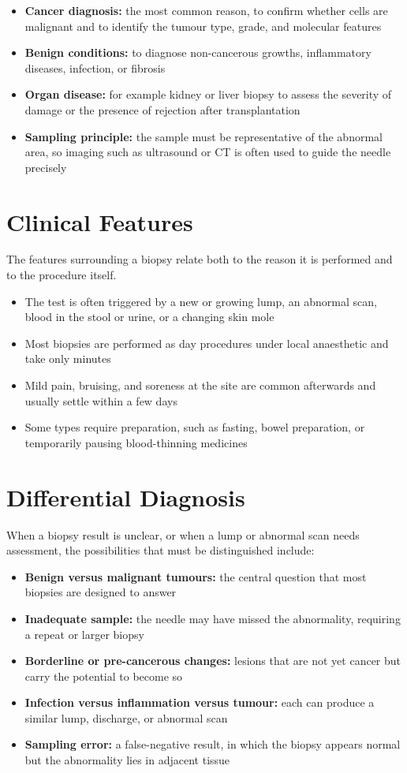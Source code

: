 \begin{itemize}
    \item \textbf{Cancer diagnosis:} the most common reason, to confirm whether cells are malignant and to identify the tumour type, grade, and molecular features
    \item \textbf{Benign conditions:} to diagnose non-cancerous growths, inflammatory diseases, infection, or fibrosis
    \item \textbf{Organ disease:} for example kidney or liver biopsy to assess the severity of damage or the presence of rejection after transplantation
    \item \textbf{Sampling principle:} the sample must be representative of the abnormal area, so imaging such as ultrasound or CT is often used to guide the needle precisely
\end{itemize}

\section*{Clinical Features}
The features surrounding a biopsy relate both to the reason it is performed and to the procedure itself.

\begin{itemize}
    \item The test is often triggered by a new or growing lump, an abnormal scan, blood in the stool or urine, or a changing skin mole
    \item Most biopsies are performed as day procedures under local anaesthetic and take only minutes
    \item Mild pain, bruising, and soreness at the site are common afterwards and usually settle within a few days
    \item Some types require preparation, such as fasting, bowel preparation, or temporarily pausing blood-thinning medicines
\end{itemize}

\section*{Differential Diagnosis}
When a biopsy result is unclear, or when a lump or abnormal scan needs assessment, the possibilities that must be distinguished include:

\begin{itemize}
    \item \textbf{Benign versus malignant tumours:} the central question that most biopsies are designed to answer
    \item \textbf{Inadequate sample:} the needle may have missed the abnormality, requiring a repeat or larger biopsy
    \item \textbf{Borderline or pre-cancerous changes:} lesions that are not yet cancer but carry the potential to become so
    \item \textbf{Infection versus inflammation versus tumour:} each can produce a similar lump, discharge, or abnormal scan
    \item \textbf{Sampling error:} a false-negative result, in which the biopsy appears normal but the abnormality lies in adjacent tissue
\end{itemize}


